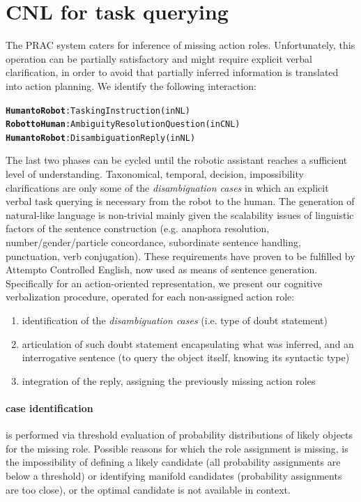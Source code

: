 \documentclass[oribibl]{llncs}
\begin{document}
\section{CNL for task querying}
The PRAC system caters for inference of missing action roles. Unfortunately, this operation can be partially satisfactory and might require explicit verbal clarification, in order to avoid that partially inferred information is translated into action planning.
We identify the following interaction:
{\large
\begin{alltt}
\textbf{\color{Red}Human to Robot} : Tasking Instruction            (in NL)
\textbf{\color{Blue}Robot to Human} : Ambiguity Resolution Question (in CNL)
\textbf{\color{Red}Human to Robot} : Disambiguation Reply           (in NL)
\end{alltt}
}
The last two phases can be cycled until the robotic assistant reaches a sufficient level of understanding. 
Taxonomical, temporal, decision, impossibility clarifications are only some of the \textit{disambiguation cases} in which an explicit verbal task querying is necessary from the robot to the human. 
The generation of natural-like language is non-trivial mainly given the scalability issues of linguistic factors of the sentence construction (e.g. anaphora resolution, number/gender/particle concordance, subordinate sentence handling, punctuation, verb conjugation). These requirements have proven to be fulfilled by Attempto Controlled English, now used as means of sentence generation.\\
Specifically for an action-oriented representation, we present our cognitive verbalization procedure, operated for each non-assigned action role:

\begin{enumerate} %
    \item identification of the \textit{disambiguation cases}  (i.e. type of doubt statement)\\
    \item articulation of such doubt statement encapsulating what was inferred, and an interrogative sentence (to query the object itself, knowing its syntactic type) \\ 
    \item integration of the reply, assigning the previously missing action roles 
\end{enumerate}

\paragraph{case identification} is performed via threshold evaluation of probability distributions of likely objects for the missing role. 
Possible reasons for which the role assignment is missing, is the impossibility of 
defining a likely candidate (all probability assignments are below a threshold) or identifying manifold candidates (probability assignments are too close), or
the optimal candidate is not available in context.  
\end{document}
